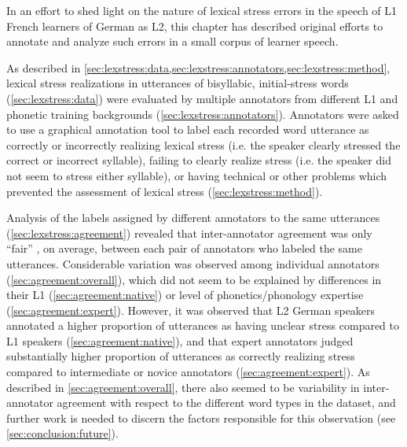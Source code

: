 	In an effort to shed light on the nature of lexical stress errors in the speech of L1 French learners of German as L2, this chapter has described original efforts to 
	annotate and analyze such errors in a small corpus of learner speech.
	
	As described in \cref{sec:lexstress:data,sec:lexstress:annotators,sec:lexstress:method},
	lexical stress realizations in utterances of bisyllabic, initial-stress words (\cref{sec:lexstress:data})
	were evaluated by multiple annotators from different L1 and phonetic training backgrounds (\cref{sec:lexstress:annotators}).
	Annotators were asked to use a graphical annotation tool to label each recorded word utterance
	as correctly or incorrectly realizing lexical stress (i.e. the speaker clearly stressed the correct or incorrect syllable), failing to clearly realize stress (i.e. the speaker did not seem to stress either syllable), or having technical or other problems which prevented the assessment of lexical stress (\cref{sec:lexstress:method}). 
	
	
	
	Analysis of the labels assigned by different annotators to the same utterances (\cref{sec:lexstress:agreement}) revealed that inter-annotator agreement was 
	only ``fair'' %
	\citep{Landis1977}, on average, between each pair of annotators who labeled the same utterances. 
	Considerable variation was observed among individual annotators (\cref{sec:agreement:overall}), which did not seem to be explained by differences 
	in their L1 (\cref{sec:agreement:native}) or level of 
	phonetics/phonology expertise (\cref{sec:agreement:expert}). 
	However, it was observed that
	L2 German speakers annotated a higher proportion of utterances as having unclear stress compared to L1 speakers (\cref{sec:agreement:native}), and that expert annotators judged substantially higher proportion of utterances as correctly realizing stress compared to intermediate or novice annotators (\cref{sec:agreement:expert}).
	As described in \cref{sec:agreement:overall}, there also seemed to be variability in inter-annotator 
	agreement with respect to the different word types %
	in the dataset, and further work is needed to discern the factors responsible for this observation (see \cref{sec:conclusion:future}).
	
